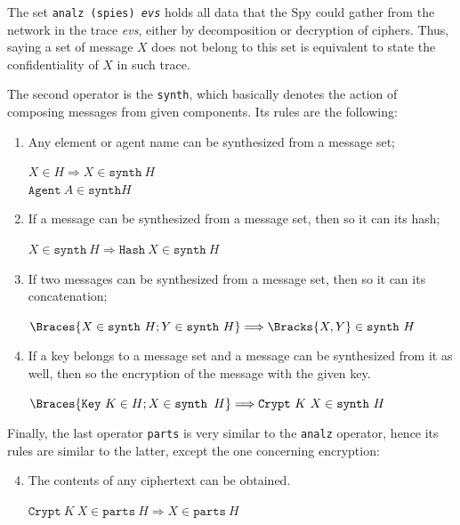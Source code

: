 The set \texttt{analz (spies) \textit{evs}} holds all data that the Spy could gather from the network in the trace \textit{evs}, either by decomposition or decryption of ciphers. Thus, saying a set of message \(X\) does not belong to this set is equivalent to state the confidentiality of \(X\) in such trace.

The second operator is the \texttt{synth}, which basically denotes the action of composing messages from given components. Its rules are the following:

\begin{enumerate}
  \item Any element or agent name can be synthesized from a message set;
  \begin{center}
    \(X \in H \Longrightarrow X \in \texttt{synth}\ H\) \\
    \(\texttt{Agent}\ A \in \texttt{synth} H\)
  \end{center}

  \item If a message can be synthesized from a message set, then so it can its hash;
  \begin{center}
    \(X \in \texttt{synth}\ H \Longrightarrow \texttt{Hash}\ X \in \texttt{synth}\ H\)
  \end{center}

  \item If two messages can be synthesized from a message set, then so it can its concatenation;
  \begin{center}
    \(\Braces{X \in \texttt{synth}\ H; Y \in \texttt{synth}\ H} \Longrightarrow \Bracks{X,Y} \in \texttt{synth}\ H\)
  \end{center}

  \item If a key belongs to a message set and a message can be synthesized from it as well, then so the encryption of the message with the given key.
  \begin{center}
    \(\Braces{\texttt{Key}\ K \in H; X \in \texttt{synth } H} \Longrightarrow \texttt{Crypt}\ K\ X \in \texttt{synth}\ H\)
  \end{center}
\end{enumerate}

Finally, the last operator \texttt{parts} is very similar to the \texttt{analz} operator, hence its rules are similar to the latter, except the one concerning encryption:

\begin{enumerate} \setcounter{enumi}{3}
  \item The contents of any ciphertext can be obtained.
  \begin{center}
    \(\texttt{Crypt}\ K\ X \in \texttt{parts}\ H \Longrightarrow X \in \texttt{parts}\ H\)
  \end{center}
\end{enumerate}

